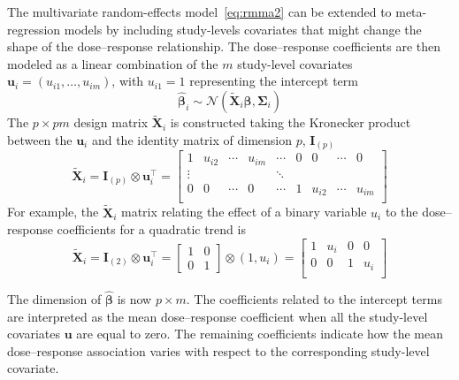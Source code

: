 \documentclass[11pt,a4paper,twoside,openany]{book}\usepackage{knitr}
\begin{document}
{{\noindent The multivariate random-effects model~\ref{eq:rmma2} can be extended to meta-regression models by including study-levels covariates that might change the shape of the dose--response relationship. The dose--response coefficients are then modeled as a linear combination of the $m$ study-level covariates $\mathbf{u}_i = \left(u_{i1}, \dots, u_{im} \right)$, with $u_{i1} = 1$ representing the intercept term
\begin{equation}
\boldsymbol{\hat \beta}_i \sim \mathcal{N}\left(\widetilde{\mathbf{X}}_i \boldsymbol{\beta}, \boldsymbol{\Sigma}_i\right)
\label{eq:rmmra2}
\end{equation}
\noindent The $p\times pm$ design matrix $\widetilde{\mathbf{X}}_i$ is constructed taking the Kronecker product between the $\mathbf{u}_i$ and the identity matrix of dimension $p$, $\mathbf{I}_{(p)}$
\begin{equation}
\widetilde{\mathbf{X}}_i = \mathbf{I}_{(p)} \otimes \mathbf{u}_i^\top = 
	\begin{bmatrix}
		1 & u_{i2} & \cdots & u_{im} & \cdots & 0 & 0 & \cdots & 0 \\
		\vdots &  &  &  & \ddots & &  &  &  \\
		0 & 0 & \cdots & 0 & \cdots & 1 & u_{i2} & \cdots & u_{im} \\
	\end{bmatrix}
\end{equation}
\noindent For example, the $\widetilde{\mathbf{X}}_i$ matrix relating the effect of a binary variable $u_i$ to the dose--response coefficients for a quadratic trend is
\begin{equation*}
\widetilde{\mathbf{X}}_i = \mathbf{I}_{(2)} \otimes \mathbf{u}_i^\top = 
	\begin{bmatrix}
		1 & 0 \\
		0 & 1
	\end{bmatrix} \otimes
	(1, u_i)=
	\begin{bmatrix}
		1 & u_i  & 0 & 0 \\
		0 & 0 & 1 & u_i  \\
	\end{bmatrix}
\end{equation*} 

\noindent The dimension of $\boldsymbol{\hat \beta}$ is now $p\times m$. The coefficients related to the intercept terms are interpreted as the mean dose--response coefficient when all the study-level covariates $\mathbf{u}$ are equal to zero. The remaining coefficients indicate how the mean dose--response association varies with respect to the corresponding study-level covariate.


}}
\end{document}
